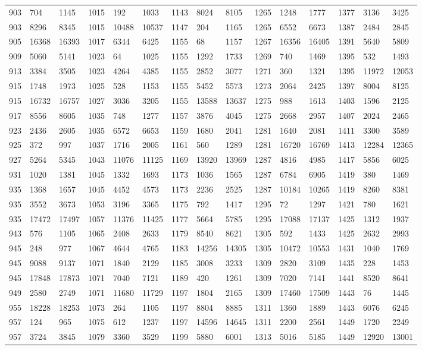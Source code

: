 \begin{longtable}{*4{A@{\hspace*{5mm}}A}}
	903&704&1145&1015&192&1033&1143&8024&8105&1265&1248&1777&1377&3136&3425\\
	903&8296&8345&1015&10488&10537&1147&204&1165&1265&6552&6673&1387&2484&2845\\
	905&16368&16393&1017&6344&6425&1155&68&1157&1267&16356&16405&1391&5640&5809\\
	909&5060&5141&1023&64&1025&1155&1292&1733&1269&740&1469&1395&532&1493\\
	913&3384&3505&1023&4264&4385&1155&2852&3077&1271&360&1321&1395&11972&12053\\
	915&1748&1973&1025&528&1153&1155&5452&5573&1273&2064&2425&1397&8004&8125\\
	915&16732&16757&1027&3036&3205&1155&13588&13637&1275&988&1613&1403&1596&2125\\
	917&8556&8605&1035&748&1277&1157&3876&4045&1275&2668&2957&1407&2024&2465\\
	923&2436&2605&1035&6572&6653&1159&1680&2041&1281&1640&2081&1411&3300&3589\\
	925&372&997&1037&1716&2005&1161&560&1289&1281&16720&16769&1413&12284&12365\\
	927&5264&5345&1043&11076&11125&1169&13920&13969&1287&4816&4985&1417&5856&6025\\
	931&1020&1381&1045&1332&1693&1173&1036&1565&1287&6784&6905&1419&380&1469\\
	935&1368&1657&1045&4452&4573&1173&2236&2525&1287&10184&10265&1419&8260&8381\\
	935&3552&3673&1053&3196&3365&1175&792&1417&1295&72&1297&1421&780&1621\\
	935&17472&17497&1057&11376&11425&1177&5664&5785&1295&17088&17137&1425&1312&1937\\
	943&576&1105&1065&2408&2633&1179&8540&8621&1305&592&1433&1425&2632&2993\\
	945&248&977&1067&4644&4765&1183&14256&14305&1305&10472&10553&1431&1040&1769\\
	945&9088&9137&1071&1840&2129&1185&3008&3233&1309&2820&3109&1435&228&1453\\
	945&17848&17873&1071&7040&7121&1189&420&1261&1309&7020&7141&1441&8520&8641\\
	949&2580&2749&1071&11680&11729&1197&1804&2165&1309&17460&17509&1443&76&1445\\
	955&18228&18253&1073&264&1105&1197&8804&8885&1311&1360&1889&1443&6076&6245\\
	957&124&965&1075&612&1237&1197&14596&14645&1311&2200&2561&1449&1720&2249\\
	957&3724&3845&1079&3360&3529&1199&5880&6001&1313&5016&5185&1449&12920&13001\\

\end{longtable}
